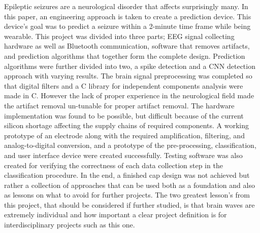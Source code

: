 Epileptic seizures are a neurological disorder that affects surprisingly many. In this paper, an engineering approach is taken to create a prediction device. This device's goal was to predict a seizure within a 2-minute time frame while being wearable. This project was divided into three parts; EEG signal collecting hardware as well as Bluetooth communication, software that removes artifacts, and prediction algorithms that together form the complete design. Prediction algorithms were further divided into two, a spike detection and a CNN detection approach with varying results. %
The brain signal preprocessing was completed so that digital filters and a C library for independent components analysis were made in C. However the lack of proper experience in the neurological field made the artifact removal un-tunable for proper artifact removal.
The hardware implementation was found to be possible, but difficult because of the current silicon shortage affecting the supply chains of required components. A working prototype of an electrode along with the required amplification, filtering, and analog-to-digital conversion, and a prototype of the pre-processing, classification, and user interface device were created successfully. Testing software was also created for verifying the correctness of each data collection step in the classification procedure.
In the end, a finished cap design was not achieved but rather a collection of approaches that can be used both as a foundation and also as lessons on what to avoid for further projects. The two greatest lesson's from this project, that should be considered if further studied, is that brain waves are extremely individual and how important a clear project definition is for interdisciplinary projects such as this one.

% 